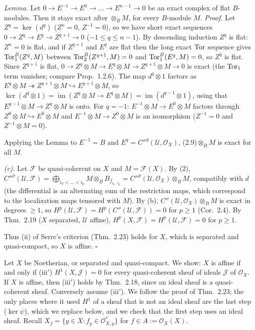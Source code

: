 \documentclass[11pt]{article}
\begin{document}
\emph{Lemma.} Let $0\to E^{-1}\to E^0\to\dots\to E^{n-1}\to0$ be an exact complex of flat $B$-modules. Then it stays exact after $\otimes_BM$, for every $B$-module $M$. \emph{Proof.} Let $Z^q=\ker(d^q)$ ($Z^n=0$, $Z^{-1}=0$), so we have short exact sequences $0\to Z^q\to E^q\to Z^{q+1}\to0$ ($-1\le q\le n-1$). By descending induction $Z^q$ is flat: $Z^n=0$ is flat, and if $Z^{q+1}$ and $E^q$ are flat then the long exact $\operatorname{Tor}$ sequence gives $\operatorname{Tor}_1^B(Z^q,M)$ between $\operatorname{Tor}_2^B(Z^{q+1},M)=0$ and $\operatorname{Tor}_1^B(E^q,M)=0$, so $Z^q$ is flat. Since $Z^{q+1}$ is flat, $0\to Z^q\otimes M\to E^q\otimes M\to Z^{q+1}\otimes M\to0$ is exact (the $\operatorname{Tor}_1$ term vanishes; compare Prop.~1.2.6). The map $d^q\otimes1$ factors as $E^q\otimes M\twoheadrightarrow Z^{q+1}\otimes M\hookrightarrow E^{q+1}\otimes M$, so $\ker(d^q\otimes1)=\operatorname{im}(Z^q\otimes M\to E^q\otimes M)=\operatorname{im}(d^{q-1}\otimes1)$, using that $E^{q-1}\otimes M\to Z^q\otimes M$ is onto. For $q=-1$: $E^{-1}\otimes M\to E^0\otimes M$ factors through $Z^0\otimes M\hookrightarrow E^0\otimes M$ and $E^{-1}\otimes M\to Z^0\otimes M$ is an isomorphism ($Z^{-1}=0$ and $Z^{-1}\otimes M=0$).

Applying the Lemma to $E^{-1}=B$ and $E^q=C''^q(\mathcal U,\mathcal O_X)$, (2.9)$\otimes_BM$ is exact for all $M$.

\emph{(c).} Let $\mathcal F$ be quasi-coherent on $X$ and $M=\mathcal F(X)$. By (2), $C''^p(\mathcal U,\mathcal F)=\bigoplus_{i_0<\dots<i_p}M\otimes_BB_{\bar f_{i_0\dots i_p}}=C''^p(\mathcal U,\mathcal O_X)\otimes_BM$, compatibly with $d$ (the differential is an alternating sum of the restriction maps, which correspond to the localization maps tensored with $M$). By (b), $C''(\mathcal U,\mathcal O_X)\otimes_BM$ is exact in degrees $\ge1$, so $H^p(\mathcal U,\mathcal F)=H^p(C''(\mathcal U,\mathcal F))=0$ for $p\ge1$ (Cor.~2.4). By Thm.~2.19 ($X$ separated, $\mathcal U$ affine), $H^p(X,\mathcal F)=H^p(\mathcal U,\mathcal F)=0$ for $p\ge1$.

Thus (ii) of Serre's criterion (Thm.~2.23) holds for $X$, which is separated and quasi-compact, so $X$ is affine. \hfill$\square$

\pf
Let $X$ be Noetherian, or separated and quasi-compact. We show: $X$ is affine if and only if (iii$'$) $H^1(X,\mathcal J)=0$ for every quasi-coherent sheaf of ideals $\mathcal J$ of $\mathcal O_X$. If $X$ is affine, then (iii$'$) holds by Thm.~2.18, since an ideal sheaf is a quasi-coherent sheaf. Conversely assume (iii$'$). We follow the proof of Thm.~2.23; the only places where it used $H^1$ of a sheaf that is not an ideal sheaf are the last step ($\ker\psi$), which we replace below, and we check that the first step uses an ideal sheaf. Recall $X_f=\{y\in X:f_y\in\mathcal O_{X,y}^*\}$ for $f\in A:=\mathcal O_X(X)$.
\end{document}
